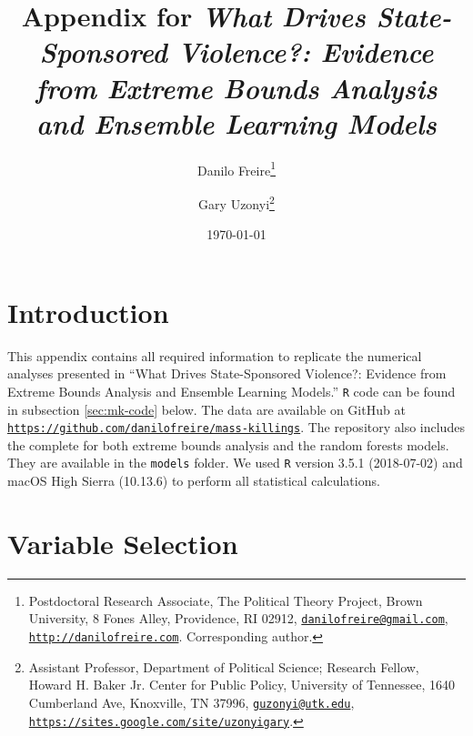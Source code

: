\documentclass[a4paper,12pt]{article}
\title{Appendix for \textit{What Drives State-Sponsored Violence?: Evidence from Extreme Bounds Analysis and Ensemble Learning Models}}
\author{Danilo Freire\thanks{Postdoctoral Research Associate, The Political Theory Project, Brown University, 8 Fones Alley, Providence, RI 02912,  \href{mailto:danilofreire@gmail.com}{\texttt{danilofreire@gmail.com}}, \href{http://danilofreire.com}{\texttt{http://danilofreire.com}}. Corresponding author.} \and Gary Uzonyi\thanks{Assistant Professor, Department of Political Science; Research Fellow, Howard H. Baker Jr. Center for Public Policy, University of Tennessee, 1640 Cumberland Ave, Knoxville, TN 37996, \href{mailto:guzonyi@utk.edu}{\texttt{guzonyi@utk.edu}}, \href{https://sites.google.com/site/uzonyigary/}{\texttt{https://sites.google.com/site/uzonyigary}}.}}
\date{\today}
\begin{document}
\maketitle

{\hypersetup{linkcolor=black}
\tableofcontents
}

\newpage
	
\section{Introduction}
\label{sec:intro}
	
\doublespacing
	
This appendix contains all required information to replicate the numerical analyses presented in ``What Drives State-Sponsored Violence?: Evidence from Extreme Bounds Analysis and Ensemble Learning Models.'' \texttt{R} code can be found in subsection \ref{sec:mk-code} below. The data are available on GitHub at \href{https://github.com/danilofreire/mass-killings}{\texttt{https://github.com/danilofreire/mass-killings}}. The repository also includes the complete for both extreme bounds analysis and the random forests models. They are available in the \texttt{models} folder. We used \texttt{R} version 3.5.1 (2018-07-02) and macOS High Sierra (10.13.6) to perform all statistical calculations.

\section{Variable Selection}
\label{sec:mk-vs}
\end{document}
